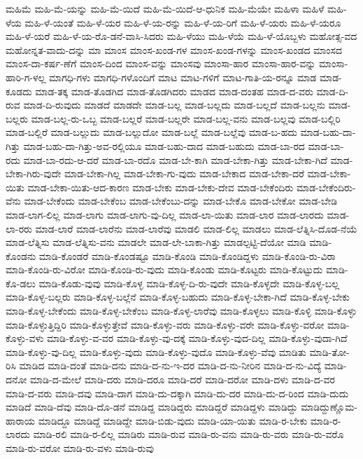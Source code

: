 {ಮಹಿಮೆ
ಮಹಿ-ಮೆ-ಯನ್ನು
ಮಹಿ-ಮೆ-ಯಿದೆ
ಮಹಿ-ಮೆ-ಯಿದೆ-ಆ-ಧುನಿಕ
ಮಹಿ-ಮೆಯೇ
ಮಹಿಳಾ
ಮಹಿಳೆ
ಮಹಿ-ಳೆಯ
ಮಹಿ-ಳೆ-ಯಂತೆ
ಮಹಿ-ಳೆ-ಯರ
ಮಹಿ-ಳೆ-ಯ-ರನ್ನು
ಮಹಿ-ಳೆ-ಯ-ರಿಗೆ
ಮಹಿ-ಳೆ-ಯರು
ಮಹಿ-ಳೆ-ಯರೂ
ಮಹಿ-ಳೆ-ಯರೆ
ಮಹಿ-ಳೆ-ಯ-ರೊ-ಡನೆ-ವಾಸಿ-ಸಿದರು
ಮಹಿ-ಳೆಯು
ಮಹಿ-ಳೆಯೆ
ಮಹಿ-ಳೆ-ಯೊಬ್ಬಳು
ಮಹೋತ್ಸ-ವದ
ಮಹೋನ್ನತ-ವಾದು-ದನ್ನು
ಮಾ
ಮಾಂಸ
ಮಾಂಸ-ಖಂಡ-ಗಳ
ಮಾಂಸ-ಖಂಡ-ಗಳನ್ನು
ಮಾಂಸ-ಖಂಡದ
ಮಾಂಸದ
ಮಾಂಸ-ದಾ-ಕರ್ಷ-ಣೆಗೆ
ಮಾಂಸ-ದಿಂದ
ಮಾಂಸ-ವನ್ನು
ಮಾಂಸವು
ಮಾಂಸಾ-ಹಾರ
ಮಾಂಸಾ-ಹಾರ-ವನ್ನು
ಮಾಂಸಾ-ಹಾರಿ-ಗ-ಳಲ್ಲ
ಮಾಗಧಿ-ಗಳು
ಮಾಗಧಿ-ಗಳೊಂದಿಗೆ
ಮಾಟ
ಮಾಟ-ಗಳಿಗೆ
ಮಾಟ-ಗಾತಿ-ಯ-ರನ್ನೂ
ಮಾಡ
ಮಾಡ-ಕೂಡದು
ಮಾಡ-ತಕ್ಕ
ಮಾಡ-ತೊಡಗಿದ
ಮಾಡ-ತೊಡಗಿದರು
ಮಾಡದ
ಮಾಡ-ದಂತಹ
ಮಾಡ-ದ-ವರು
ಮಾಡ-ದಿ-ರುವ
ಮಾಡ-ದಿ-ರುವುದು
ಮಾಡದೆ
ಮಾಡದೇ
ಮಾಡ-ಬಲ್ಲ
ಮಾಡ-ಬಲ್ಲದು
ಮಾಡ-ಬಲ್ಲದೆ
ಮಾಡ-ಬಲ್ಲನು
ಮಾಡ-ಬಲ್ಲರು
ಮಾಡ-ಬಲ್ಲ-ರು-ಒಬ್ಬ
ಮಾಡ-ಬಲ್ಲರೆ
ಮಾಡ-ಬಲ್ಲರೇ
ಮಾಡ-ಬಲ್ಲ-ವನು
ಮಾಡ-ಬಲ್ಲವು
ಮಾಡ-ಬಲ್ಲಿರಿ
ಮಾಡ-ಬಲ್ಲಿರೆ
ಮಾಡ-ಬಲ್ಲುದು
ಮಾಡ-ಬಲ್ಲುದೋ
ಮಾಡ-ಬಲ್ಲೆ
ಮಾಡ-ಬಲ್ಲೆವು
ಮಾಡ-ಬ-ಹದು
ಮಾಡ-ಬಹು-ದಾ-ಗಿತ್ತು
ಮಾಡ-ಬಹು-ದಾ-ಗಿತ್ತು-ಅವ-ರಲ್ಲಿಯೂ
ಮಾಡ-ಬಹು-ದಾದ
ಮಾಡ-ಬಹುದು
ಮಾಡ-ಬಾ-ರದ
ಮಾಡ-ಬಾ-ರದು
ಮಾಡ-ಬಾ-ರದು-ಆ-ದರೆ
ಮಾಡ-ಬಾ-ರದೊ
ಮಾಡ-ಬೇ-ಕಾಗಿ
ಮಾಡ-ಬೇಕಾ-ಗಿತ್ತು
ಮಾಡ-ಬೇಕಾ-ಗಿದೆ
ಮಾಡ-ಬೇಕಾ-ಗಿರು-ವುದೇ
ಮಾಡ-ಬೇಕಾ-ಗಿಲ್ಲ
ಮಾಡ-ಬೇಕಾ-ಗು-ವುದು
ಮಾಡ-ಬೇಕಾದ
ಮಾಡ-ಬೇಕಾ-ದರೆ
ಮಾಡ-ಬೇಕಾ-ಯಿತು
ಮಾಡ-ಬೇಕಾ-ಯಿತು-ಆದ-ಕಾರಣ
ಮಾಡ-ಬೇಕು
ಮಾಡ-ಬೇಕು-ದೇವ
ಮಾಡ-ಬೇಕೆಂದಿರು
ಮಾಡ-ಬೇಕೆಂದಿರು-ವೆನು
ಮಾಡ-ಬೇಕೆಂದು
ಮಾಡ-ಬೇಕೆಂಬ
ಮಾಡ-ಬೇಕೆಂಬು-ದನ್ನು
ಮಾಡ-ಬೇಕೊ
ಮಾಡ-ಬೇಕೋ
ಮಾಡ-ಬೇಡಿ
ಮಾಡ-ಲಾಗ-ಲಿಲ್ಲ
ಮಾಡ-ಲಾಗು
ಮಾಡ-ಲಾಗು-ವು-ದಿಲ್ಲ
ಮಾಡ-ಲಾ-ಯಿತು
ಮಾಡ-ಲಾರ
ಮಾಡ-ಲಾರದು
ಮಾಡ-ಲಾ-ರರು
ಮಾಡ-ಲಾರೆ
ಮಾಡ-ಲಾರೆನು
ಮಾಡ-ಲಾರೆವು
ಮಾಡಲಿ
ಮಾಡ-ಲಿಲ್ಲ
ಮಾಡಲು
ಮಾಡ-ಲೆತ್ನಿಸಿ-ದೊಡ-ನೆಯೆ
ಮಾಡ-ಲೆತ್ನಿಸು
ಮಾಡ-ಲೆತ್ನಿಸು-ವನು
ಮಾಡಲೇ
ಮಾಡ-ಲೇ-ಬಾಕಾ-ಗಿತ್ತು
ಮಾಡಲ್ಪಟ್ಟಿ-ದೆಯೋ
ಮಾಡಿ
ಮಾಡಿ-ಕೊಂಡನು
ಮಾಡಿ-ಕೊಂಡರೆ
ಮಾಡಿ-ಕೊಂಡಷ್ಟೂ
ಮಾಡಿ-ಕೊಂಡಿ
ಮಾಡಿ-ಕೊಂಡಿದ್ದಳು
ಮಾಡಿ-ಕೊಂಡಿ-ರು-ವಿರಾ
ಮಾಡಿ-ಕೊಂಡಿ-ರು-ವಿರೋ
ಮಾಡಿ-ಕೊಂಡಿ-ರು-ವುದು
ಮಾಡಿ-ಕೊಂಡು
ಮಾಡಿ-ಕೊಟ್ಟರು
ಮಾಡಿ-ಕೊಟ್ಟುದು
ಮಾಡಿ-ಕೊ-ಡಲು
ಮಾಡಿ-ಕೊಡು-ವುವು
ಮಾಡಿ-ಕೊಳ್ಳ
ಮಾಡಿ-ಕೊಳ್ಳ-ದಿ-ರು-ವುದೇ
ಮಾಡಿ-ಕೊಳ್ಳದೇ
ಮಾಡಿ-ಕೊಳ್ಳ-ಬಲ್ಲ
ಮಾಡಿ-ಕೊಳ್ಳ-ಬಲ್ಲರು
ಮಾಡಿ-ಕೊಳ್ಳ-ಬಲ್ಲೆನೆ
ಮಾಡಿ-ಕೊಳ್ಳ-ಬಹುದು
ಮಾಡಿ-ಕೊಳ್ಳ-ಬೇಕಾ-ಗಿದೆ
ಮಾಡಿ-ಕೊಳ್ಳ-ಬೇಕು
ಮಾಡಿ-ಕೊಳ್ಳ-ಬೇಕೆಂದು
ಮಾಡಿ-ಕೊಳ್ಳ-ಬೇಕೆಂಬ
ಮಾಡಿ-ಕೊಳ್ಳ-ಲಾರೆವು
ಮಾಡಿ-ಕೊಳ್ಳಲು
ಮಾಡಿ-ಕೊಳ್ಳಿ
ಮಾಡಿ-ಕೊಳ್ಳು
ಮಾಡಿ-ಕೊಳ್ಳುತ್ತಿದ್ದಿರಿ
ಮಾಡಿ-ಕೊಳ್ಳುತ್ತೇವೆ
ಮಾಡಿ-ಕೊಳ್ಳು-ವರು
ಮಾಡಿ-ಕೊಳ್ಳು-ವರೇ
ಮಾಡಿ-ಕೊಳ್ಳು-ವರೋ
ಮಾಡಿ-ಕೊಳ್ಳು-ವಳು
ಮಾಡಿ-ಕೊಳ್ಳು-ವ-ವರ
ಮಾಡಿ-ಕೊಳ್ಳು-ವು-ದಕ್ಕೆ
ಮಾಡಿ-ಕೊಳ್ಳು-ವುದ-ದಿಲ್ಲ
ಮಾಡಿ-ಕೊಳ್ಳು-ವುದಾ-ಗಿದೆ
ಮಾಡಿ-ಕೊಳ್ಳು-ವು-ದಿಲ್ಲ
ಮಾಡಿ-ಕೊಳ್ಳು-ವುದು
ಮಾಡಿ-ಕೊಳ್ಳು-ವುದೊ
ಮಾಡಿ-ಕೊಳ್ಳು-ವೆವು
ಮಾಡಿತು
ಮಾಡಿ-ತೋ-ರಿಸಿ
ಮಾಡಿದ
ಮಾಡಿ-ದಂತೆ
ಮಾಡಿ-ದನು
ಮಾಡಿ-ದ-ನು-ಇ-ದರ
ಮಾಡಿ-ದ-ನು-ನೀರಿನ
ಮಾಡಿ-ದ-ನು-ವಿದ್ಯೆ
ಮಾಡಿ-ದನೋ
ಮಾಡಿ-ದ-ಮೇಲೆ
ಮಾಡಿ-ದರು
ಮಾಡಿ-ದರೂ
ಮಾಡಿ-ದರೆ
ಮಾಡಿ-ದರೋ
ಮಾಡಿ-ದಳು
ಮಾಡಿ-ದ-ವರ
ಮಾಡಿ-ದ-ವರು
ಮಾಡಿ-ದವು
ಮಾಡಿ-ದಾಗ
ಮಾಡಿ-ದು-ದಕ್ಕಾಗಿ
ಮಾಡಿ-ದು-ದರ
ಮಾಡಿ-ದು-ದ-ರಿಂದ
ಮಾಡಿ-ದುದು
ಮಾಡಿದೆ
ಮಾಡಿ-ದೆವು
ಮಾಡಿ-ದೊ-ಡನೆ
ಮಾಡಿದ್ದ
ಮಾಡಿದ್ದರು
ಮಾಡಿದ್ದರೆ
ಮಾಡಿದ್ದಳು
ಮಾಡಿದ್ದು
ಮಾಡಿದ್ದುಣ್ಣೊಮ-ಹಾರಾಯ
ಮಾಡಿದ್ದೂ
ಮಾಡಿದ್ದೆ
ಮಾಡಿದ್ದೇ
ಮಾಡಿ-ಬಿಡು-ವುದು
ಮಾಡಿ-ಯಾ-ಯಿತು
ಮಾಡಿ-ರ-ಬೇಕು
ಮಾಡಿ-ರ-ಲಾರದು
ಮಾಡಿ-ರಲಿ
ಮಾಡಿ-ರ-ಲಿಲ್ಲ
ಮಾಡಿರು
ಮಾಡಿ-ರುವ
ಮಾಡಿ-ರು-ವನು
ಮಾಡಿ-ರು-ವರು
ಮಾಡಿ-ರು-ವರೊ
ಮಾಡಿ-ರು-ವರೋ
ಮಾಡಿ-ರು-ವಳು
ಮಾಡಿ-ರುವು
}
